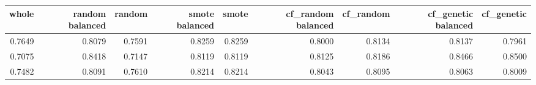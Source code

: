 \begin{tabular}{rrrrrrrrr}
\toprule

 whole &  random balanced &  random &  smote balanced &  smote &  cf\_random balanced &  cf\_random &  cf\_genetic balanced &  cf\_genetic \\
\midrule

0.7649 &           0.8079 &  0.7591 &          0.8259 & 0.8259 &              0.8000 &     0.8134 &               0.8137 &      0.7961 \\
0.7075 &           0.8418 &  0.7147 &          0.8119 & 0.8119 &              0.8125 &     0.8186 &               0.8466 &      0.8500 \\
0.7482 &           0.8091 &  0.7610 &          0.8214 & 0.8214 &              0.8043 &     0.8095 &               0.8063 &      0.8009 \\

\bottomrule
\end{tabular}
